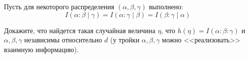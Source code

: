 Пусть для некоторого распределения $(\alpha, \beta, \gamma)$ выполнено:
$$
    I(\alpha : \beta \mid \gamma) =  I(\alpha : \gamma \mid \beta) = I(\beta : \gamma \mid \alpha)
$$

Докажите, что найдется такая случайная величина $\eta$, что $h(\eta) = I(\alpha : \beta : \gamma)$ и
$\alpha, \beta, \gamma$ независимы относительно $d$ (у тройки $\alpha, \beta, \gamma$ можно
<<реализовать>> взаимную информацию).